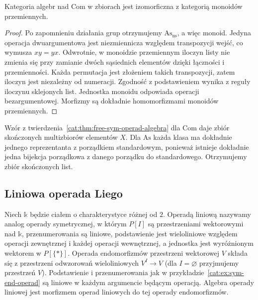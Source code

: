 \begin{stwierdzenie}\label{cat:prop:com-algebras}
Kategoria algebr nad $\mathrm{Com}$ w zbiorach jest izomorficzna z kategorią monoidów przemiennych.
\end{stwierdzenie}
\begin{proof}
Po zapomnieniu działania grup otrzymujemy $\mathrm{As}_{\mathrm{ns}}$, a więc monoid. Jedyna operacja dwuargumentowa jest niezmiennicza względem transpozycji wejść, co wymusza $xy=yx$. Odwrotnie, w monoidzie przemiennym iloczyn listy nie zmienia się przy zamianie dwóch sąsiednich elementów dzięki łączności i przemienności. Każda permutacja jest złożeniem takich transpozycji, zatem iloczyn jest niezależny od numeracji. Zgodność z podstawieniem wynika z reguły iloczynu sklejonych list. Jednostka monoidu odpowiada operacji bezargumentowej. Morfizmy są dokładnie homomorfizmami monoidów przemiennych.
\end{proof}
Wzór z twierdzenia~\ref{cat:thm:free-sym-operad-algebra} dla $\mathrm{Com}$ daje zbiór skończonych multizbiorów elementów $X$. Dla $\mathrm{As}$ każda klasa ma dokładnie jednego reprezentanta z porządkiem standardowym, ponieważ istnieje dokładnie jedna bijekcja porządkowa z danego porządku do standardowego. Otrzymujemy zbiór skończonych list.

\subsection{Liniowa operada Liego}

Niech $\mathbb k$ będzie ciałem o charakterystyce różnej od $2$. Operadą liniową nazywamy analog operady symetrycznej, w którym $P[I]$ są przestrzeniami wektorowymi nad $\mathbb k$, przenumerowania są liniowe, podstawienie jest wieloliniowe względem operacji zewnętrznej i każdej operacji wewnętrznej, a jednostka jest wyróżnionym wektorem w $P[\{*\}]$. Operada endomorfizmów przestrzeni wektorowej $V$ składa się z przestrzeni odwzorowań wieloliniowych $V^I\to V$ (dla $I=\varnothing$ przyjmujemy przestrzeń $V$). Podstawienie i przenumerowania jak w przykładzie~\ref{cat:ex:sym-end-operad} są liniowe w każdym argumencie będącym operacją. Algebra operady liniowej jest morfizmem operad liniowych do tej operady endomorfizmów.

